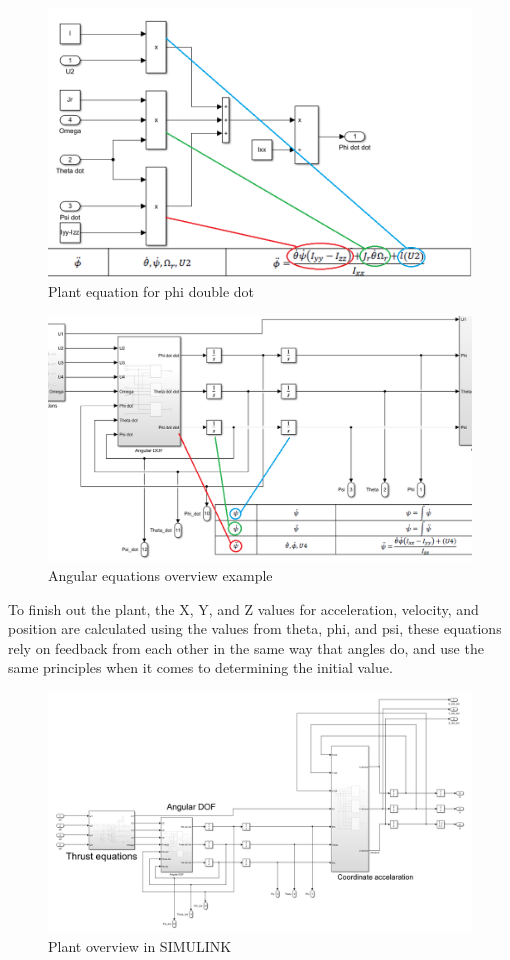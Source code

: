 \begin{figure}[H]
\begin{center}
   \includegraphics[scale =0.7]{pictures/control/plant equation phi example.png}
\end{center}
\caption{Plant equation for phi double dot}
\end{figure}

\begin{figure}[H]
\begin{center}
   \includegraphics[scale =0.6]{pictures/control/plant pic1.png}
\end{center}
\caption{Angular equations overview example}
\end{figure}

To finish out the plant, the X, Y, and Z values for acceleration, velocity, and position are calculated using the values from theta, phi, and psi, these equations rely on feedback from each other in the same way that angles do, and use the same principles when it comes to determining the initial value. 

\begin{figure}[H]
   \includegraphics[scale =0.6]{pictures/control/Plant overview.png}
\caption{Plant overview in SIMULINK}
\end{figure}
